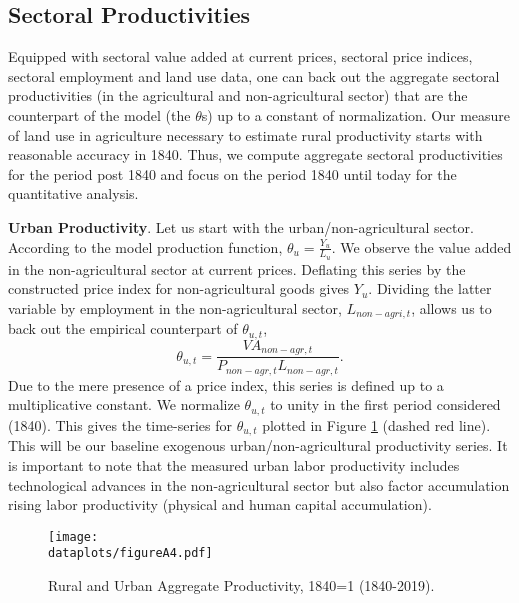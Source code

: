\documentclass[11pt]{report}
\newcommand{\dataplots}{../output/data/plots}
\begin{document}
\subsection{Sectoral Productivities}\label{A-sec:sectoral-productivities}

Equipped with sectoral value added at current prices, sectoral price indices, sectoral employment and land use data, one can back out the aggregate sectoral productivities (in the agricultural and non-agricultural sector) that are the counterpart of the model (the $\theta$s) up to a constant of normalization. Our measure of land use in agriculture necessary to estimate rural productivity starts with reasonable accuracy in 1840. Thus, we compute aggregate sectoral productivities for the period post 1840 and focus on the period 1840 until today for the quantitative analysis.

\noindent \textbf{Urban Productivity}. Let us start with the urban/non-agricultural sector. According to the model production function, $\theta_u=\frac{Y_u}{L_u}$. We observe the value added in the non-agricultural sector at current prices. Deflating this series by the constructed price index for non-agricultural goods gives $Y_u$. Dividing the latter variable by employment in the non-agricultural sector, $L_{non-agri,t}$, allows us to back out the empirical counterpart of $\theta_{u,t}$,
\begin{equation*}
\theta_{u,t}=\frac{VA_{non-agr,t}}{P_{non-agr,t}L_{non-agr,t}}.
\end{equation*}
Due to the mere presence of a price index, this series is defined up to a multiplicative constant. We normalize $\theta_{u,t}$ to unity in the first period considered (1840). This gives the time-series for $\theta_{u,t}$ plotted in Figure \ref{A-fig:theta} (dashed red line). This will be our baseline exogenous urban/non-agricultural productivity series. It is important to note that the measured urban labor productivity includes technological advances in the non-agricultural sector but also factor accumulation rising labor productivity (physical and human capital accumulation). 

\begin{figure}
	\begin{center}
		\texttt{[image: \\dataplots/figureA4.pdf]}
	\end{center}
	\vspace{-0.5cm}
	\caption{Rural and Urban Aggregate Productivity, 1840=1 (1840-2019).}
	\label{A-fig:theta}
\end{figure}
\end{document}
